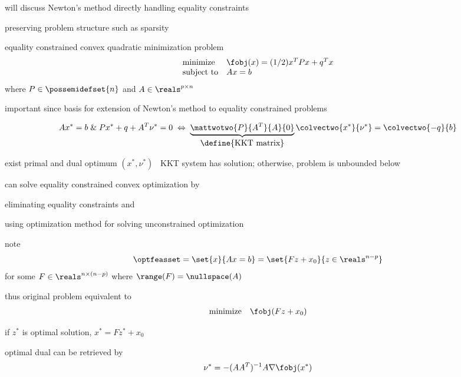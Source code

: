 \documentclass[17pt,landscape]{foils}
\begin{document}
{\vvitem
	will discuss Newton's method directly handling equality constraints
	\bit
	\item
		preserving problem structure such as sparsity
	\eit
\eit
\vfill



\bit
\item
	equality constrained convex quadratic minimization problem
	$$
		\begin{array}{ll}
			\mbox{minimize} &
				\fobj(x) = (1/2)x^T P x + q^Tx
			\\
			\mbox{subject to} &
				Ax = b
		\end{array}
	$$
	where $P\in\possemidefset{n}$ and $A\in\reals^{p\times n}$

\vitem
	important since basis for extension of Newton's method to equality constrained problems

\vitem
	$$
		Ax^\ast = b \; \& \; Px^\ast + q + A^T\nu^\ast = 0
		\;
		\Leftrightarrow
		\;
		\underbrace{
		\mattwotwo{P}{A^T}{A}{0}
		}_{\mbox{\define{KKT matrix}}}
		\colvectwo{x^\ast}{\nu^\ast}
		=
		\colvectwo{-q}{b}
	$$

\vitem
	exist primal and dual optimum $(x^\ast,\nu^\ast)$ \iaoi\ KKT system has solution;
	otherwise, problem is unbounded below
\eit
\vfill



\bit
\item
	can solve equality constrained convex optimization
	by
	\bit
	\item
		eliminating equality constraints and
	\item
		using optimization method for solving unconstrained optimization
	\eit

\vitem
	note
	$$
		\optfeasset
		=
		\set{x}{Ax=b}
		=
		\set{Fz + x_0}{z\in\reals^{n-p}}
	$$
	for some $F\in\reals^{n\times(n-p)}$
	where $\range(F) = \nullspace(A)$

\vitem
	thus original problem equivalent to
	$$
		\begin{array}{ll}
			\mbox{minimize} &
				\fobj(Fz + x_0)
		\end{array}
	$$

\vitem
	if $z^\ast$ is optimal solution, $x^\ast = Fz^\ast + x_0$

\vitem
	optimal dual can be retrieved by
	$$
		\nu^\ast = - (AA^T)^{-1} A\nabla \fobj(x^\ast)
	$$
\eit



}
\end{document}

